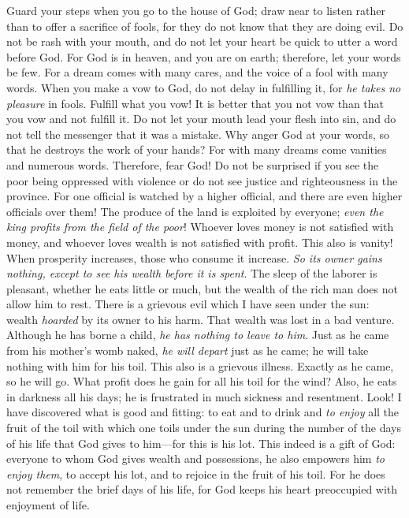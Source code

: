 \begin{biblechapter} %
  Guard your steps when you go to the house of God; 
draw near to listen rather than to offer a sacrifice of fools, 
for they do not know that they are doing evil.
\verse Do not be rash with your mouth, 
and do not let your heart be quick to utter a word before God. 
For God is in heaven, and you are on earth; 
therefore, let your words be few.
\verse For a dream comes with many cares, 
and the voice of a fool with many words.
\verse When you make a vow to God, 
do not delay in fulfilling it, 
for \textit{he takes no pleasure} in fools. 
Fulfill what you vow!
\verse It is better that you not vow 
than that you vow and not fulfill it.
\verse Do not let your mouth lead your flesh into sin, 
and do not tell the messenger that it was a mistake. 
Why anger God at your words, 
so that he destroys the work of your hands?
\verse For with many dreams come vanities and numerous words. 
Therefore, fear God!
 Do not be surprised if you see the poor being oppressed with violence 
or do not see justice and righteousness in the province. 
For one official is watched by a higher official, 
and there are even higher officials over them!
\verse The produce of the land is exploited by everyone; 
\textit{even the king profits from the field of the poor}!
 Whoever loves money is not satisfied with money, 
and whoever loves wealth is not satisfied with profit. 
This also is vanity!
\verse When prosperity increases, 
those who consume it increase. 
\textit{So its owner gains nothing, 
except to see his wealth before it is spent}.
\verse The sleep of the laborer is pleasant, whether he eats little or much, 
but the wealth of the rich man does not allow him to rest.
 There is a grievous evil which I have seen under the sun: wealth \textit{hoarded} by its owner to his harm.
\verse That wealth was lost in a bad venture. Although he has borne a child, \textit{he has nothing to leave to him}.
\verse Just as he came from his mother’s womb naked, \textit{he will depart} just as he came; he will take nothing with him for his toil.
\verse This also is a grievous illness. Exactly as he came, so he will go. What profit does he gain for all his toil for the wind?
\verse Also, he eats in darkness all his days; he is frustrated in much sickness and resentment.
 Look! I have discovered what is good and fitting: to eat and to drink and \textit{to enjoy} all the fruit of the toil with which one toils under the sun during the number of the days of his life that God gives to him—for this is his lot.
\verse This indeed is a gift of God: everyone to whom God gives wealth and possessions, he also empowers him \textit{to enjoy them}, to accept his lot, and to rejoice in the fruit of his toil.
\verse For he does not remember the brief days of his life, for God keeps his heart preoccupied with enjoyment of life.
\end{biblechapter}

